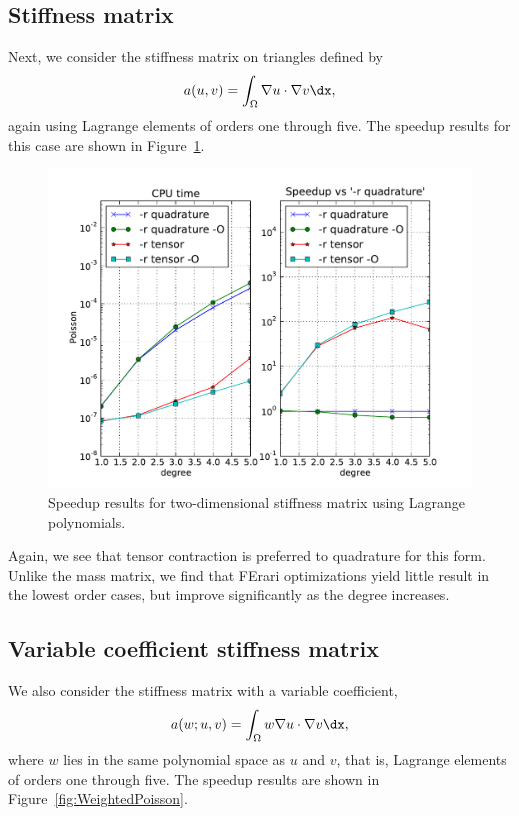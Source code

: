 \subsection{Stiffness matrix}

Next, we consider the stiffness matrix on triangles defined by
\begin{equation}
  a(u, v) = \int_{\Omega} \nabla u \cdot \nabla v \dx,
\end{equation}
again using Lagrange elements of orders one through five. The speedup
results for this case are shown in Figure~\ref{fig:Poisson}.

\begin{figure}
  \begin{center}
    \includegraphics[width=12cm]{chapters/kirby-3/pdf/Poisson.pdf}
    \caption{Speedup results for two-dimensional stiffness matrix using Lagrange polynomials.}
    \label{fig:Poisson}
  \end{center}
\end{figure}

Again, we see that tensor contraction is preferred to quadrature for
this form. Unlike the mass matrix, we find that FErari optimizations
yield little result in the lowest order cases, but improve
significantly as the degree increases.

\subsection{Variable coefficient stiffness matrix}

We also consider the stiffness matrix with a variable coefficient,
\begin{equation}
  a(w; u, v) = \int_{\Omega} w \nabla u \cdot \nabla v \dx,
\end{equation}
where $ w $ lies in the same polynomial space as $ u $ and $ v$, that
is, Lagrange elements of orders one through five. The speedup results
are shown in Figure~\ref{fig:WeightedPoisson}.

